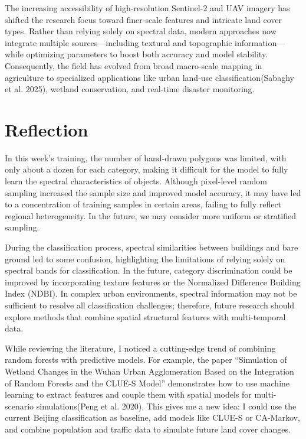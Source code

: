 \documentclass[
  letterpaper,
  DIV=11,
  numbers=noendperiod]{scrreprt}
\begin{document}
The increasing accessibility of high-resolution Sentinel-2 and UAV
imagery has shifted the research focus toward finer-scale features and
intricate land cover types. Rather than relying solely on spectral data,
modern approaches now integrate multiple sources---including textural
and topographic information---while optimizing parameters to boost both
accuracy and model stability. Consequently, the field has evolved from
broad macro-scale mapping in agriculture to specialized applications
like urban land-use classification(Sabaghy et al. 2025), wetland
conservation, and real-time disaster monitoring.

\section{Reflection}\label{reflection-3}

In this week's training, the number of hand-drawn polygons was limited,
with only about a dozen for each category, making it difficult for the
model to fully learn the spectral characteristics of objects. Although
pixel-level random sampling increased the sample size and improved model
accuracy, it may have led to a concentration of training samples in
certain areas, failing to fully reflect regional heterogeneity. In the
future, we may consider more uniform or stratified sampling.

During the classification process, spectral similarities between
buildings and bare ground led to some confusion, highlighting the
limitations of relying solely on spectral bands for classification. In
the future, category discrimination could be improved by incorporating
texture features or the Normalized Difference Building Index (NDBI). In
complex urban environments, spectral information may not be sufficient
to resolve all classification challenges; therefore, future research
should explore methods that combine spatial structural features with
multi-temporal data.

While reviewing the literature, I noticed a cutting-edge trend of
combining random forests with predictive models. For example, the paper
``Simulation of Wetland Changes in the Wuhan Urban Agglomeration Based
on the Integration of Random Forests and the CLUE-S Model'' demonstrates
how to use machine learning to extract features and couple them with
spatial models for multi-scenario simulations(Peng et al. 2020). This
gives me a new idea: I could use the current Beijing classification as
baseline, add models like CLUE-S or CA-Markov, and combine population
and traffic data to simulate future land cover changes.
\end{document}
